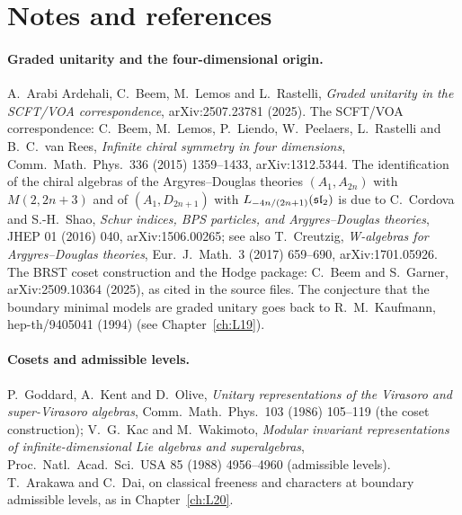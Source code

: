 \section{Notes and references}\label{l29:sec:notes}

\paragraph{Graded unitarity and the four-dimensional origin.} A.~Arabi Ardehali, C.~Beem, M.~Lemos and L.~Rastelli,
\emph{Graded unitarity in the SCFT/VOA correspondence}, arXiv:2507.23781 (2025). The SCFT/VOA correspondence: C.~Beem,
M.~Lemos, P.~Liendo, W.~Peelaers, L.~Rastelli and B.~C.~van Rees, \emph{Infinite chiral symmetry in four dimensions},
Comm.\ Math.\ Phys.\ 336 (2015) 1359--1433, arXiv:1312.5344. The identification of the chiral algebras of the
Argyres--Douglas theories $(A_1,A_{2n})$ with $M(2,2n+3)$ and of $(A_1,D_{2n+1})$ with $L_{-4n/(2n+1)}(\mathfrak{sl}_2)$ is
due to C.~Cordova and S.-H.~Shao, \emph{Schur indices, BPS particles, and Argyres--Douglas theories}, JHEP 01 (2016) 040,
arXiv:1506.00265; see also T.~Creutzig, \emph{W-algebras for
Argyres--Douglas theories}, Eur.\ J.\ Math.\ 3 (2017) 659--690, arXiv:1701.05926. The BRST coset construction and the
Hodge package: C.~Beem and S.~Garner, arXiv:2509.10364 (2025), as cited in the source files. The conjecture that the
boundary minimal models are graded unitary goes back to R.~M.~Kaufmann, hep-th/9405041 (1994) (see Chapter~\ref{ch:L19}).

\paragraph{Cosets and admissible levels.} P.~Goddard, A.~Kent and D.~Olive, \emph{Unitary representations of the
Virasoro and super-Virasoro algebras}, Comm.\ Math.\ Phys.\ 103 (1986) 105--119 (the coset construction); V.~G.~Kac and
M.~Wakimoto, \emph{Modular invariant representations of infinite-dimensional Lie algebras and superalgebras}, Proc.\ Natl.\
Acad.\ Sci.\ USA 85 (1988) 4956--4960 (admissible levels). T.~Arakawa and C.~Dai, on classical freeness and characters at
boundary admissible levels, as in Chapter~\ref{ch:L20}.


